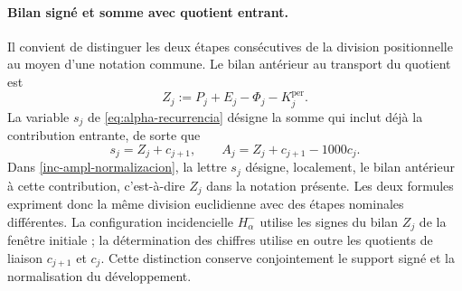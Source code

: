 \paragraph{Bilan signé et somme avec quotient entrant.}
\label{ampl-alfa-z-s-aclaracion}
Il convient de distinguer les deux étapes consécutives de la division
positionnelle au moyen d'une notation commune. Le bilan antérieur au transport
du quotient est
\[
 Z_j:=P_j+E_j-\Phi_j-K_j^{\mathrm{per}}.
\]
La variable $s_j$ de \eqref{eq:alpha-recurrencia} désigne la somme qui
inclut déjà la contribution entrante, de sorte que
\[
 s_j=Z_j+c_{j+1},\qquad
 A_j=Z_j+c_{j+1}-1000c_j.
\]
Dans \eqref{inc-ampl-normalizacion}, la lettre $s_j$ désigne, localement,
le bilan antérieur à cette contribution, c'est-à-dire $Z_j$ dans la notation
présente. Les deux formules expriment donc la même division
euclidienne avec des étapes nominales différentes. La configuration incidencielle
$H^-_\alpha$ utilise les signes du bilan $Z_j$ de la fenêtre initiale ;
la détermination des chiffres utilise en outre les quotients de liaison
$c_{j+1}$ et $c_j$. Cette distinction conserve conjointement le support
signé et la normalisation du développement.
